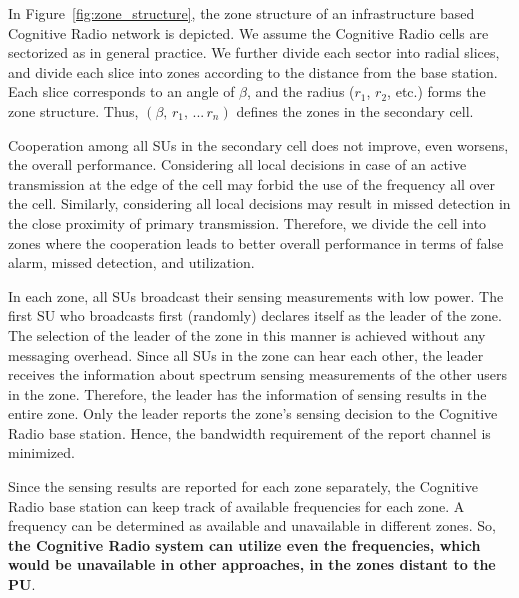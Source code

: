 \documentclass[conference,compsoc]{IEEEtran}
\newcommand{\CR}{Cognitive Radio }
\begin{document}
In Figure~\ref{fig:zone_structure}, the zone structure of an infrastructure based \CR network is depicted. We assume the \CR cells are sectorized as in general practice. We further divide each sector into radial slices, and divide each slice into zones according to the distance from the base station. Each slice corresponds to an angle of $\beta$, and the radius ($r_1$, $r_2$, etc.) forms the zone structure. Thus, $(\beta, \, r_1, \, ... \, r_n)$ defines the zones in the secondary cell.

Cooperation among all SUs in the secondary cell does not improve, even worsens, the overall performance. Considering all local decisions in case of an active transmission at the edge of the cell may forbid the use of the frequency all over the cell. Similarly, considering all local decisions may result in missed detection in the close proximity of primary transmission. Therefore, we divide the cell into zones where the cooperation leads to better overall performance in terms of false alarm, missed detection, and utilization.

In each zone, all SUs broadcast their sensing measurements with low power. The first SU who broadcasts first (randomly) declares itself as the leader of the zone. The selection of the leader of the zone in this manner is achieved without any messaging overhead. Since all SUs in the zone can hear each other, the leader receives the information about spectrum sensing measurements of the other users in the zone. Therefore, the leader has the information of sensing results in the entire zone. Only the leader reports the zone's sensing decision to the \CR base station. Hence, the bandwidth requirement of the report channel is minimized.

Since the sensing results are reported for each zone separately, the \CR base station can keep track of available frequencies for each zone. A frequency can be determined as available and unavailable in different zones. So, \textbf{the Cognitive Radio system can utilize even the frequencies, which would be unavailable in other approaches, in the zones distant to the PU}.
\end{document}
